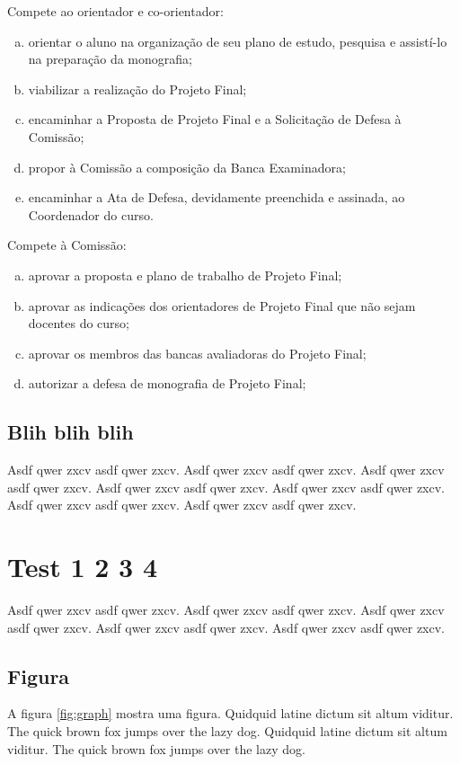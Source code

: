 Compete ao orientador e co-orientador:
\begin{enumerate}[a.]
\item orientar o aluno na organização de seu plano de estudo, pesquisa e assistí-lo na preparação da monografia;
\item viabilizar a realização do Projeto Final;
\item encaminhar a Proposta de Projeto Final e a Solicitação de Defesa à Comissão;
\item propor à Comissão a composição da Banca Examinadora;
\item encaminhar a Ata de Defesa, devidamente preenchida e assinada, ao Coordenador do curso.
\end{enumerate}

Compete à Comissão:
\begin{enumerate}[a.]
\item aprovar a proposta e plano de trabalho de Projeto Final;
\item aprovar as indicações dos orientadores de Projeto Final que não sejam docentes do curso;
\item aprovar os membros das bancas avaliadoras do Projeto Final;
\item autorizar a defesa de monografia de Projeto Final;
\end{enumerate}

\subsection{Blih blih blih} 
 
Asdf qwer zxcv asdf qwer zxcv.
Asdf qwer zxcv asdf qwer zxcv.
Asdf qwer zxcv asdf qwer zxcv.
Asdf qwer zxcv asdf qwer zxcv.
Asdf qwer zxcv asdf qwer zxcv.
Asdf qwer zxcv asdf qwer zxcv.
Asdf qwer zxcv asdf qwer zxcv.


\section{Test 1 2 3 4}
\label{sec:lateracao}
 
Asdf qwer zxcv asdf qwer zxcv.
Asdf qwer zxcv asdf qwer zxcv.
Asdf qwer zxcv asdf qwer zxcv.
Asdf qwer zxcv asdf qwer zxcv.
Asdf qwer zxcv asdf qwer zxcv.


\subsection{Figura}

A figura \ref{fig:graph} mostra uma figura. Quidquid latine dictum sit altum
viditur. The quick brown fox jumps over the lazy dog. Quidquid latine dictum
sit altum viditur. The quick brown fox jumps over the lazy dog.

